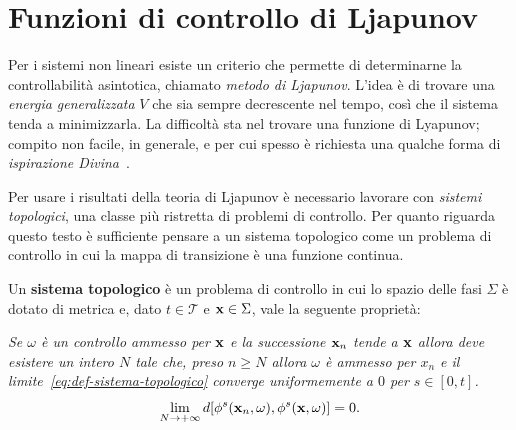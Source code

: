 \section{Funzioni di controllo di Ljapunov}
Per i sistemi non lineari esiste un criterio che permette di determinarne
la controllabilità asintotica, chiamato \emph{metodo di Ljapunov}.
L'idea è di trovare una \emph{energia generalizzata} $V$
che sia sempre decrescente nel tempo,
così che il sistema tenda a minimizzarla.
La difficoltà sta nel trovare una funzione di Lyapunov;
compito non facile, in generale, e per cui spesso è richiesta
una qualche forma di \emph{ispirazione Divina}~\cite{strogatz}.


Per usare i risultati della teoria di Ljapunov è necessario lavorare
con \emph{sistemi topologici}, una classe più ristretta di problemi di controllo.
Per quanto riguarda questo testo è sufficiente pensare a un sistema topologico
come un problema di controllo in cui la mappa di transizione è una funzione
continua.

\begin{definition}
    Un \textbf{sistema topologico} è un problema di controllo in
    cui lo spazio delle fasi $\Sigma$ è dotato di metrica e,
    dato $t \in \mathcal T$ e $\mathbf{x} \in \Sigma$,
    vale la seguente proprietà:

    \emph{Se $\omega$ è un controllo ammesso per $\mathbf{x}$ e la successione
    ${\mathbf{x}_n}$ tende a $\mathbf{x}$ allora deve esistere un intero
    $N$ tale che, preso $n \geq N$ allora $\omega$ è ammesso per $x_n$
    e il limite~\eqref{eq:def-sistema-topologico} converge uniformemente a $0$ per $s \in [0, t]$.}
    \begin{equation}
        \lim_{N \to +\infty} d[\phi^s(\mathbf{x}_n, \omega), \phi^s(\mathbf{x}, \omega)] = 0.
        \label{eq:def-sistema-topologico}
    \end{equation}
\end{definition}


